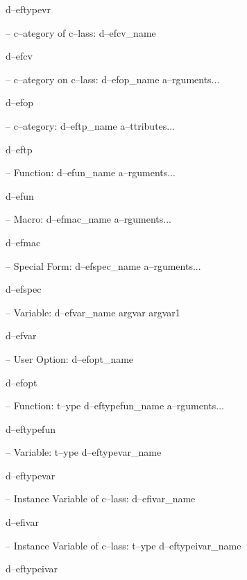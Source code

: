 \documentclass{book}
\begin{document}
%
d--eftypevr

\hbox{}-- c--ategory of c--lass: d--efcv\_name


%
d--efcv

\hbox{}-- c--ategory on c--lass: d--efop\_name a--rguments...


%
d--efop

\hbox{}-- c--ategory: d--eftp\_name a--ttributes...


%
d--eftp

\hbox{}-- Function: d--efun\_name a--rguments...


%
d--efun

\hbox{}-- Macro: d--efmac\_name a--rguments...


%
d--efmac

\hbox{}-- Special Form: d--efspec\_name a--rguments...


%
d--efspec

\hbox{}-- Variable: d--efvar\_name argvar argvar1


%
d--efvar

\hbox{}-- User Option: d--efopt\_name


%
d--efopt

\hbox{}-- Function: t--ype d--eftypefun\_name a--rguments...


%
d--eftypefun

\hbox{}-- Variable: t--ype d--eftypevar\_name


%
d--eftypevar

\hbox{}-- Instance Variable of c--lass: d--efivar\_name


%
d--efivar

\hbox{}-- Instance Variable of c--lass: t--ype d--eftypeivar\_name


%
d--eftypeivar
\end{document}
